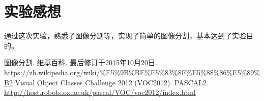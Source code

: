 \documentclass[a4paper, 12pt, UTF8]{article}
\begin{document}
\section{实验感想}

通过这次实验，熟悉了图像分割等，实现了简单的图像分割，基本达到了实验目的。


\renewcommand{\refname}{参考}
\begin{thebibliography}{9}
 图像分割. 维基百科. 最后修订于2015年10月20日. \url{https://zh.wikipedia.org/wiki/%E5%9B%BE%E5%83%8F%E5%88%86%E5%89%B2}
 Visual Object Classes Challenge 2012 (VOC2012).  PASCAL2. \url{http://host.robots.ox.ac.uk/pascal/VOC/voc2012/index.html}
\end{thebibliography}
\end{document}
